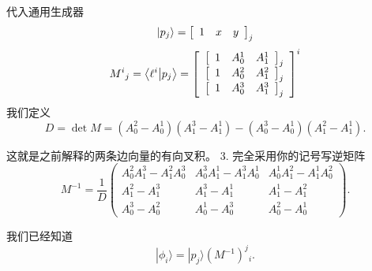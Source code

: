 代入通用生成器
\[
    \ket{p_j}=
    \tarrf{ccc}{1&x&y}_j
\]
\[
    M^{i}{}_{j}=\braket{\ell^i}{p_j}
    =\tarr{cc}{
        \tarr{ccc}{1&A^1_0&A^1_1}_j
        \\
        \tarr{ccc}{1&A^2_0&A^2_1}_j
        \\
        \tarr{ccc}{1&A^3_0&A^3_1}_j
    }^i
\]
我们定义
\[
    \boxed{
        D=\det M
        =(A^2_0-A^1_0)(A^3_1-A^1_1)
        -(A^3_0-A^1_0)(A^2_1-A^1_1).
    }
\]

这就是之前解释的两条边向量的有向叉积。
3. 完全采用你的记号写逆矩阵
\[
    \boxed{
        M^{-1}=\frac1D
        \begin{pmatrix}
            A^2_0A^3_1-A^2_1A^3_0
             &
            A^3_0A^1_1-A^3_1A^1_0
             &
            A^1_0A^2_1-A^1_1A^2_0
            \\
            A^2_1-A^3_1
             &
            A^3_1-A^1_1
             &
            A^1_1-A^2_1
            \\
            A^3_0-A^2_0
             &
            A^1_0-A^3_0
             &
            A^2_0-A^1_0
        \end{pmatrix}.
    }
\]


我们已经知道
\[
    \boxed{
    |\phi_i\rangle=|p_j\rangle(M^{-1})^j{}_i.
    }
\]



